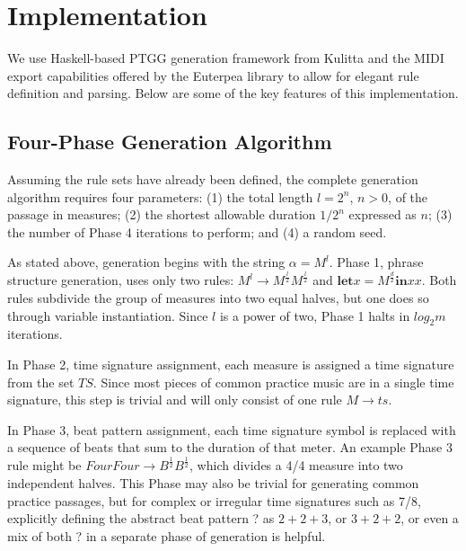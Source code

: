 \documentclass{article}
\begin{document}

\section{Implementation}

We use Haskell-based PTGG generation framework from Kulitta and the MIDI export capabilities offered by the Euterpea library \cite{euterpea} to allow for elegant rule definition and parsing. Below are some of the key features of this implementation.

\subsection{Four-Phase Generation Algorithm}

Assuming the rule sets have already been defined, the complete generation algorithm requires four parameters: (1) the total length $l = 2^n$, $n > 0$, of the passage in measures; (2) the shortest allowable duration $1/{2^n}$ expressed as $n$; (3) the number of Phase 4 iterations to perform; and (4) a random seed.

As stated above, generation begins with the string $\alpha = M^l$. Phase 1, phrase structure generation, uses only two rules: $M^l \rightarrow M^\frac{l}{2} M^\frac{l}{2}$ and $\textbf{let} x = M^\frac{d}{2} \textbf{in} x x$. Both rules subdivide the group of measures into two equal halves, but one does so through variable instantiation. Since $l$ is a power of two, Phase 1 halts in $log_2 m$ iterations.

In Phase 2, time signature assignment, each measure is assigned a time signature from the set $TS$. Since most pieces of common practice music are in a single time signature, this step is trivial and will only consist of one rule $M \rightarrow ts$.

In Phase 3, beat pattern assignment, each time signature symbol is replaced with a sequence of beats that sum to the duration of that meter. An example Phase 3 rule might be $FourFour \rightarrow B^\frac{1}{2} B^\frac{1}{2}$, which divides a 4/4 measure into two independent halves. This Phase may also be trivial for generating common practice passages, but for complex or irregular time signatures such as 7/8, explicitly defining the abstract beat pattern ? as $2 + 2 + 3$, or $3 + 2 + 2$, or even a mix of both ? in a separate phase of generation is helpful.
\end{document}
